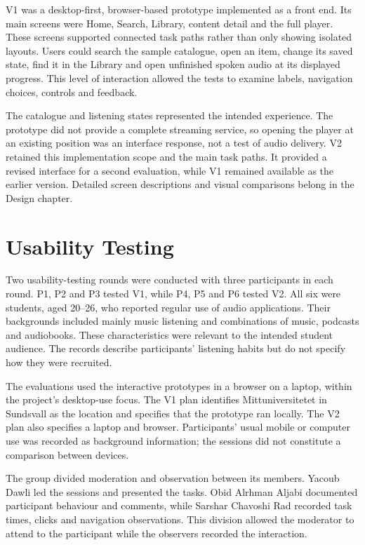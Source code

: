 V1 was a desktop-first, browser-based prototype implemented as a front end.
Its main screens were Home, Search, Library, content detail and the full
player. These screens supported connected task paths rather than only
showing isolated layouts. Users could search the sample catalogue, open an
item, change its saved state, find it in the Library and open unfinished
spoken audio at its displayed progress. This level of interaction allowed
the tests to examine labels, navigation choices, controls and feedback.

The catalogue and listening states represented the intended experience.
The prototype did not provide a complete streaming service, so opening the
player at an existing position was an interface response, not a test of
audio delivery. V2 retained this implementation scope and the main task
paths. It provided a revised interface for a second evaluation, while V1
remained available as the earlier version. Detailed screen descriptions and
visual comparisons belong in the Design chapter.

\section{Usability Testing}
\label{sec:method-usability-testing}

Two usability-testing rounds were conducted with three participants in each
round. P1, P2 and P3 tested V1, while P4, P5 and P6 tested V2. All six were
students, aged 20--26, who reported regular use of audio applications.
Their backgrounds included mainly music listening and combinations of music,
podcasts and audiobooks. These characteristics were relevant to the intended
student audience. The records describe participants' listening habits but do
not specify how they were recruited.

The evaluations used the interactive prototypes in a browser on a laptop,
within the project's desktop-use focus. The V1 plan identifies
Mittuniversitetet in Sundsvall as the location and specifies that the
prototype ran locally. The V2 plan also specifies a laptop and browser.
Participants' usual mobile or computer use was recorded as background
information; the sessions did not constitute a comparison between devices.

The group divided moderation and observation between its members. Yacoub
Dawli led the sessions and presented the tasks. Obid Alrhman Aljabi
documented participant behaviour and comments, while Sarshar Chavoshi Rad
recorded task times, clicks and navigation observations. This division
allowed the moderator to attend to the participant while the observers
recorded the interaction.

